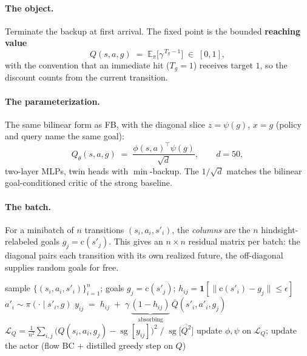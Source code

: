 \documentclass[11pt]{article}
\newcommand{\E}{\mathbb{E}}
\newcommand{\ind}[1]{\mathbf{1}\!\left[#1\right]}
\newcommand{\sg}{\operatorname{sg}}
\newcommand{\cube}{\mathrm{c}}
\begin{document}
\paragraph{The object.} Terminate the backup at first arrival. The fixed point is
the bounded \textbf{reaching value}
\begin{equation}
\label{eq:Qobj}
Q(s,a,g) \;=\; \E_{\pi}\big[\gamma^{\,T_g-1}\big] \;\in\; [0,1],
\end{equation}
with the convention that an immediate hit ($T_g=1$) receives target $1$, so the
discount counts from the current transition.

\paragraph{The parameterization.} The same bilinear form as FB, with the diagonal
slice $z=\psi(g)$, $x=g$ (policy and query name the same goal):
\begin{equation}
Q_\theta(s,a,g) \;=\; \frac{\phi(s,a)^{\top}\psi(g)}{\sqrt{d}},
\qquad d = 50,
\end{equation}
two-layer MLPs, twin heads with $\min$-backup. The $1/\sqrt d$ matches the
bilinear goal-conditioned critic of the strong baseline.

\paragraph{The batch.} For a minibatch of $n$ transitions $(s_i,a_i,s'_i)$, the
\emph{columns} are the $n$ hindsight-relabeled goals $g_j=\cube(s'_j)$. This gives
an $n\times n$ residual matrix per batch: the diagonal pairs each transition with
its own realized future, the off-diagonal supplies random goals for free.

\begin{algorithm}[h]
\caption{Phase 1 --- goal-reaching value (absorbing)}
\begin{algorithmic}[1]
  \State sample $\{(s_i,a_i,s'_i)\}_{i=1}^{n}$; \; goals $g_j=\cube(s'_j)$; \; $h_{ij}=\ind{\|\cube(s'_i)-g_j\|\le\epsilon}$
  \State $a'_i \sim \pi(\cdot\mid s'_i, g)$ 
  \State $y_{ij} \;=\; h_{ij} \;+\; \gamma\,\underbrace{(1-h_{ij})}_{\text{absorbing}}\,\bar Q(s'_i,a'_i,g_j)$
  \State $\displaystyle \mathcal{L}_Q=\frac{1}{n^2}\sum_{i,j}\big(Q(s_i,a_i,g_j)-\sg[y_{ij}]\big)^{2}\;\big/\;\sg\big[\overline{Q^{2}}\big]$
  \State update $\phi,\psi$ on $\mathcal{L}_Q$; update the actor (flow BC $+$ distilled greedy step on $Q$)
\EndFor
\end{algorithmic}
\end{algorithm}
\end{document}
